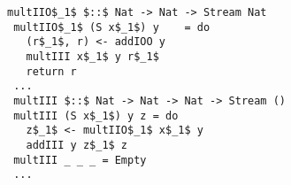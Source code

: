 \begin{figure}[h]
  \centering
  \begin{minipage}{\columnwidth}
    \begin{lstlisting}[frame=tb]
 multIIO$_1$ $::$ Nat -> Nat -> Stream Nat
 multIIO$_1$ (S x$_1$) y    = do
   (r$_1$, r) <- addIOO y
   multIII x$_1$ y r$_1$
   return r
 ...
 multIII $::$ Nat -> Nat -> Nat -> Stream ()
 multIII (S x$_1$) y z = do
   z$_1$ <- multIIO$_1$ x$_1$ y
   addIII y z$_1$ z
 multIII _ _ _ = Empty
 ...
    \end{lstlisting}
  \end{minipage}
\end{figure}
